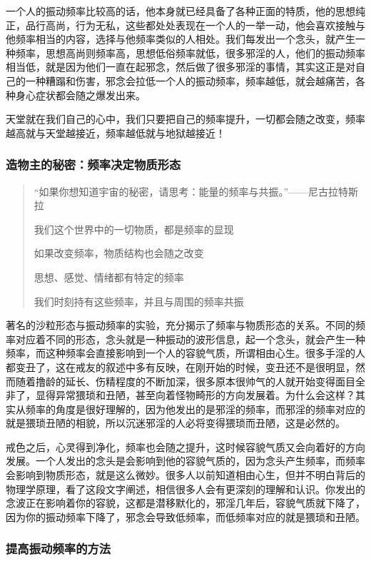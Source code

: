 \documentclass[fontset=founder]{ctexart}
\begin{document}
一个人的振动频率比较高的话，他本身就已经具备了各种正面的特质，他的思想纯正，品行高尚，行为无私，这些都处处表现在一个人的一举一动，他会喜欢接触与他频率相当的内容，选择与他频率类似的人相处。我们每发出一个念头，就产生一种频率，思想高尚则频率高，思想低俗频率就低，很多邪淫的人，他们的振动频率相当低，就是因为他们一直在起邪念，然后做了很多邪淫的事情，其实这正是对自己的一种糟蹋和伤害，邪念会拉低一个人的振动频率，频率越低，就会越痛苦，各种身心症状都会随之爆发出来。

天堂就在我们自己的心中，我们只要把自己的频率提升，一切都会随之改变，频率越高就与天堂越接近，频率越低就与地狱越接近！

\subsubsection{造物主的秘密：频率决定物质形态}

\begin{quotation}
    “如果你想知道宇宙的秘密，请思考：能量的频率与共振。”\hfill ——尼古拉特斯拉

    我们这个世界中的一切物质，都是频率的显现

    如果改变频率，物质结构也会随之改变

    思想、感觉、情绪都有特定的频率

    我们时刻持有这些频率，并且与周围的频率共振
\end{quotation}

著名的沙粒形态与振动频率的实验，充分揭示了频率与物质形态的关系。不同的频率对应着不同的形态，念头就是一种振动的波形信息，起一个念头，就会产生一种频率，而这种频率会直接影响到一个人的容貌气质，所谓相由心生。很多手淫的人都变丑了，这在戒友的叙述中多有反映，在刚开始的时候，变丑还不是很明显，然而随着撸龄的延长、伤精程度的不断加深，很多原本很帅气的人就开始变得面目全非了，显得异常猥琐和丑陋，甚至向着怪物畸形的方向发展着。为什么会这样？其实从频率的角度是很好理解的，因为他发出的是邪淫的频率，而邪淫的频率对应的就是猥琐丑陋的相貌，所以沉迷邪淫的人必将变得猥琐而丑陋，这是必然的。

戒色之后，心灵得到净化，频率也会随之提升，这时候容貌气质又会向着好的方向发展。一个人发出的念头是会影响到他的容貌气质的，因为念头产生频率，而频率会影响到物质形态，就是这么微妙。很多人以前知道相由心生，但并不明白背后的物理学原理，看了这段文字阐述，相信很多人会有更深刻的理解和认识。你发出的念波正在影响着你的容貌，这都是潜移默化的，邪淫几年后，容貌气质就下降了，因为你的振动频率下降了，邪念会导致低频率，而低频率对应的就是猥琐和丑陋。

\subsubsection{提高振动频率的方法}
\end{document}
